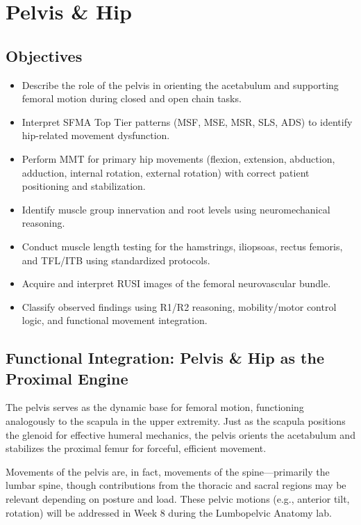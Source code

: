 \chapter{Pelvis \& Hip}\label{chp:pelvis_hip}

\section*{Objectives}

\begin{itemize}
  \item Describe the role of the pelvis in orienting the acetabulum and supporting femoral motion during closed and open chain tasks.
  \item Interpret SFMA Top Tier patterns (MSF, MSE, MSR, SLS, ADS) to identify hip-related movement dysfunction.
  \item Perform MMT for primary hip movements (flexion, extension, abduction, adduction, internal rotation, external rotation) with correct patient positioning and stabilization.
  \item Identify muscle group innervation and root levels using neuromechanical reasoning.
  \item Conduct muscle length testing for the hamstrings, iliopsoas, rectus femoris, and TFL/ITB using standardized protocols.
  \item Acquire and interpret RUSI images of the femoral neurovascular bundle.
  \item Classify observed findings using R1/R2 reasoning, mobility/motor control logic, and functional movement integration.
\end{itemize}

\section*{Functional Integration: Pelvis \& Hip as the Proximal Engine}

The pelvis serves as the dynamic base for femoral motion, functioning analogously to the scapula in the upper extremity. Just as the scapula positions the glenoid for effective humeral mechanics, the pelvis orients the acetabulum and stabilizes the proximal femur for forceful, efficient movement.

Movements of the pelvis are, in fact, movements of the spine—primarily the lumbar spine, though contributions from the thoracic and sacral regions may be relevant depending on posture and load. These pelvic motions (e.g., anterior tilt, rotation) will be addressed in Week 8 during the Lumbopelvic Anatomy lab.

